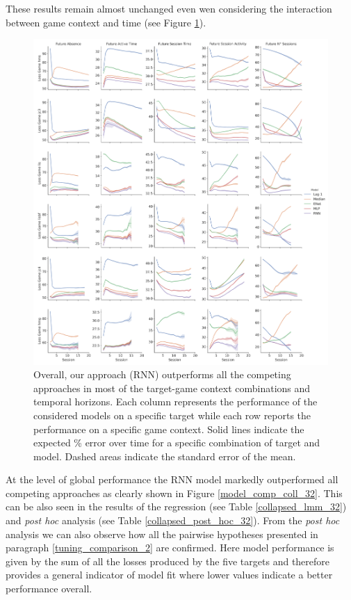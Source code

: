 These results remain almost unchanged even wen considering the interaction between game context and time (see Figure \ref{model_comp_non_coll_32}).
\begin{figure}[h]
\centering
\includegraphics[height=0.5\textheight,keepaspectratio]{images/chapter_3/models_comparison_non_collapsed_32.png}
\caption[\textbf{Model comparison without collapsing}]{ Overall, our approach (RNN) outperforms all the competing approaches in most of the target-game context combinations and temporal horizons. Each column represents the performance of the considered models on a specific target while each row reports the performance on a specific game context. Solid lines indicate the expected \% error over time for a specific combination of target and model. Dashed areas indicate the standard error of the mean.}
\label{model_comp_non_coll_32} 
\end{figure}
At the level of global performance the RNN model markedly outperformed all competing approaches as clearly shown in Figure \ref{model_comp_coll_32}. This can be also seen in the results of the regression (see Table \ref{collapsed_lmm_32}) and  \textit{post hoc} analysis (see Table \ref{collapsed_post_hoc_32}). From the \textit{post hoc} analysis we can also observe how all the pairwise hypotheses presented in paragraph \ref{tuning_comparison_2} are confirmed. Here model performance is given by the sum of all the losses produced by the five targets and therefore provides a general indicator of model fit where lower values indicate a better performance overall.
